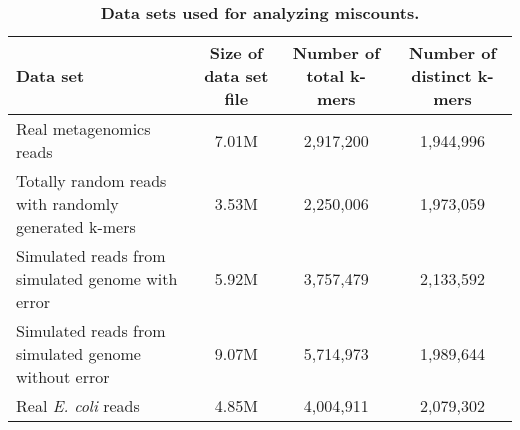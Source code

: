 

% 


\begin{table}[!ht]
\caption{
\bf{Data sets used for analyzing miscounts.}}
\begin{tabular}{ | p{5cm} | c | c | c |}
\hline
Data set & Size of data set file & Number of total k-mers & Number of distinct k-mers \\
\hline
Real metagenomics reads                                  & 7.01M  & 2,917,200  & 1,944,996 \\
\hline
Totally random reads with randomly generated k-mers      & 3.53M  & 2,250,006  & 1,973,059 \\
\hline
Simulated reads from simulated genome with error         & 5.92M  & 3,757,479  & 2,133,592 \\
\hline
Simulated reads from simulated genome without error      & 9.07M  & 5,714,973  & 1,989,644 \\
\hline
Real {\em E. coli} reads                                        & 4.85M  & 4,004,911  & 2,079,302 \\
\end{tabular}
\begin{flushleft}
\end{flushleft}
\label{table:random_data}
\end{table}




